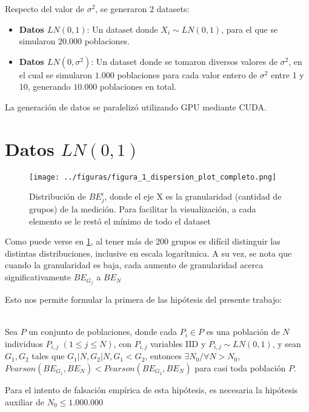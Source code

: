 Respecto del valor de $\sigma^2$, se generaron 2 datasets:

\begin{itemize}
    \item \textbf{Datos $LN(0,1)$}: Un dataset donde $X_i \sim LN(0,1)$, para el que se simularon $20.000$ poblaciones.
    \item \textbf{Datos $LN(0,\sigma^2)$}: Un dataset donde se tomaron diversos valores de $\sigma^2$, en el cual se simularon $1.000$ poblaciones para cada valor entero de $\sigma^2$ entre 1 y 10, generando $10.000$ poblaciones en total.
\end{itemize}

La generación de datos se paralelizó utilizando GPU mediante CUDA\cite{lasorsa2024simluacion_cuda}.

\section{Datos $LN(0,1)$}

\begin{figure}[H] %
    \centering %
    \texttt{[image: ../figuras/figura\_1\_dispersion\_plot\_completo.png]} %
    \caption{Distribución de $BE_j^i$, donde el eje X es la granularidad (cantidad de grupos) de la medición. Para facilitar la visualización, a cada elemento se le restó el mínimo de todo el dataset}
    \label{fig:1} %
\end{figure}

Como puede verse en \ref{fig:1}, al tener más de 200 grupos es difícil distinguir las distintas distribuciones, inclusive en escala logarítmica. A su vez, se nota que cuando la granularidad es baja, cada aumento de granularidad acerca significativamente $BE_{G_j}$ a $BE_N$

Esto nos permite formular la primera de las hipótesis del presente trabajo:

\begin{hipotesis}\label{hipo:1}
    \\
    Sea $P$ un conjunto de poblaciones, donde cada $P_i \in P$ es una población de $N$ individuos $P_{i,j}$ $(1 \leq j \leq N)$, con $P_{i,j}$ variables IID y $P_{i,j} \sim LN(0,1)$, y sean $G_1, G_2$ tales que $G_1|N, G_2|N, G_1 < G_2$, entonces $\exists N_0 / \forall N > N_0 $, $Pearson(BE_{G_1},BE_N) < Pearson(BE_{G_2},BE_N)$ para casi toda población $P$.
    
    Para el intento de falsación empírica de esta hipótesis, es necesaria la hipótesis auxiliar de $N_0 \leq 1.000.000$    
%
\end{hipotesis}

